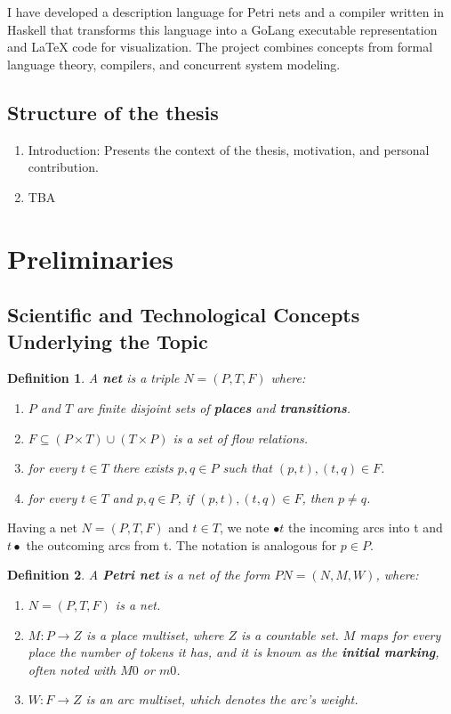 \documentclass[12pt]{article}
\newtheorem{definition}{Definition}
\begin{document}
    I have developed a description language for Petri nets and a compiler written in Haskell 
    that transforms this language into a GoLang executable representation and LaTeX code for visualization. 
    The project combines concepts from formal language theory, compilers, 
    and concurrent system modeling.

    \subsection{Structure of the thesis}
    \begin{enumerate}
        \item Introduction: Presents the context of the thesis, motivation, and personal contribution.
        \item TBA
    \end{enumerate}
\section{Preliminaries}
    \subsection{Scientific and Technological Concepts Underlying the Topic}
    \begin{definition}
        A \textbf{net} is a triple \(N=(P,T,F)\) where:  \cite{rozenberg1996elementary}
        \begin{enumerate}
            \item \(P\) and \(T\) are finite disjoint sets of \textbf{places} and \textbf{transitions}.
            \item \(F \subseteq (P \times T)\cup(T \times P)\) is a set of flow relations.
            \item for every \(t \in T\) there exists $p,q \in P$ such that $(p,t),(t,q) \in F$.
            \item for every $t \in T$ and $p,q \in P$, if $(p,t),(t,q) \in F$, then $p \neq q$.
        \end{enumerate}
    \end{definition}

    Having a net \(N=(P,T,F)\) and \(t \in T\), we note $\bullet t$ the incoming arcs into t and $t \bullet$ the outcoming arcs from t. The notation is analogous for $p \in P$.

    \begin{definition}
        A \textbf{Petri net} is a net of the form $PN=(N,M,W)$, where: \cite{rozenberg1996elementary}
        \begin{enumerate}
            \item $N=(P,T,F)$ is a net.
            \item \(M: P \rightarrow Z\) is a place multiset, where \(Z\) is a countable set. \(M\) maps for every place the number of tokens it has, and it is known as the \textbf{initial marking}, often noted with \(M0\) or \(m0\).
            \item \(W: F \rightarrow Z\) is an arc multiset, which denotes the arc's weight. 
        \end{enumerate}
    \end{definition}
    
\end{document}
